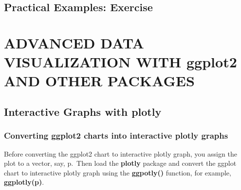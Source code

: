 \documentclass[
]{book}
\begin{document}
\section{Practical Examples: Exercise}\label{practical-examples-exercise-1}

\chapter{ADVANCED DATA VISUALIZATION WITH ggplot2 AND OTHER PACKAGES}\label{advanced-data-visualization-with-ggplot2-and-other-packages}

\section{Interactive Graphs with plotly}\label{interactive-graphs-with-plotly}

\subsection{Converting ggplot2 charts into interactive plotly graphs}\label{converting-ggplot2-charts-into-interactive-plotly-graphs}

Before converting the ggplot2 chart to interactive plotly graph, you assign the plot to a vector, say, p.~Then load the \textbf{plotly} package and convert the ggplot chart to interactive plotly graph using the \textbf{ggpotly()} function, for example, \textbf{ggplotly(p)}.
\end{document}
